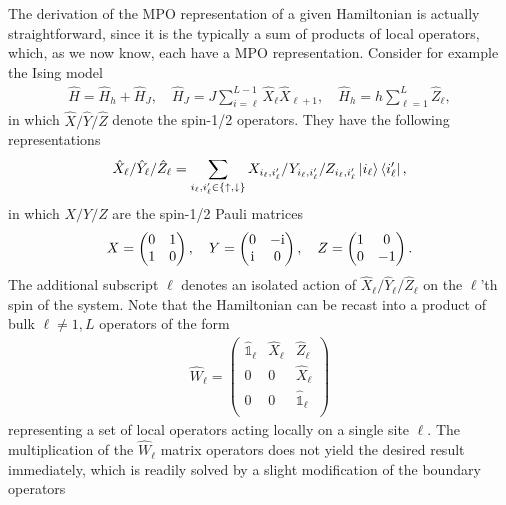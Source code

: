The derivation of the MPO representation of a given Hamiltonian is actually straightforward, since it is the typically a sum of products of local operators, which, as we now know, each have a MPO representation.
Consider for example the Ising model
\begin{align}
    \hat H = \hat H_{h} + \hat H_{J},
    \quad
    \hat H_{J} = J\sum_{i=\ell}^{L-1}\hat X_\ell \hat X_{\ell+1},
    \quad
    \hat H_{h} = h\sum_{\ell=1}^{L}\hat Z_\ell,
\end{align}
in which $\hat X/\hat Y/\hat Z$ denote the spin-1/2 operators.
They have the following representations
\begin{align}
    \hat X_\ell/\hat Y_\ell/\hat Z_\ell = \sum_{i_\ell,i'_\ell\in\{\uparrow,\downarrow\}}X_{i_\ell,i_\ell'}/Y_{i_\ell,i_\ell'}/Z_{i_\ell,i_\ell'}\ket{i_\ell}\bra{i'_\ell},
\end{align}
in which $X/Y/Z$ are the spin-1/2 Pauli matrices
\begin{align}
    X =
    \begin{pmatrix}
        0 & 1 \\
        1 & 0
    \end{pmatrix}
    ,
    \quad
    Y =
    \begin{pmatrix}
        0 & -\mathrm i \\
        \mathrm i & 0
    \end{pmatrix}
    ,
    \quad
    Z =
    \begin{pmatrix}
        1 & 0 \\
        0 & -1
    \end{pmatrix}.
\end{align}
The additional subscript $\ell$ denotes an isolated action of $\hat X_\ell/\hat Y_\ell/\hat Z_\ell$ on the $\ell$'th spin of the system.
Note that the Hamiltonian can be recast into a product of bulk $\ell\neq1,L$ operators of the form
\begin{align}
    \hat W_\ell =
    \begin{pmatrix}
        \hat{\mathbb 1}_\ell & \hat X_\ell & \hat Z_\ell\\
         0 & 0 & \hat X_\ell\\
        0 & 0 & \hat{\mathbb 1}_\ell\\
    \end{pmatrix}
\end{align}
representing a set of local operators acting locally on a single site $\ell$.
The multiplication of the $\hat W_\ell$ matrix operators does not yield the desired result immediately, which is readily solved by a slight modification of the boundary operators
